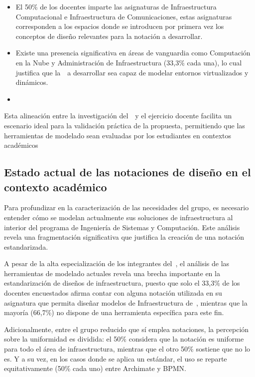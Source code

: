 

\begin{itemize}
	\item El 50\% de los docentes imparte las asignaturas de Infraestructura Computacional e Infraestructura de Comunicaciones, estas asignaturas corresponden a los espacios donde se introducen por primera vez los conceptos de diseño relevantes para la notación a desarrollar.
	\item Existe una presencia significativa en áreas de vanguardia como Computación en la Nube y Administración de Infraestructura (33,3\% cada una), lo cual justifica que la~\NDITI~a desarrollar sea capaz de modelar entornos virtualizados y dinámicos.
	\item 
\end{itemize}

Esta alineación entre la investigación del~\GRID~y el ejercicio docente facilita un escenario ideal para la validación práctica de la propuesta, permitiendo que las herramientas de modelado sean evaluadas por los estudiantes en contextos académicos

\subsection{Estado actual de las notaciones de diseño en el contexto académico}
Para profundizar en la caracterización de las necesidades del grupo, es necesario entender cómo se modelan actualmente sus soluciones de infraestructura al interior del programa de Ingeniería de Sistemas y Computación. Este análisis revela una fragmentación significativa que justifica la creación de una notación estandarizada.


A pesar de la alta especialización de los integrantes del~\GRID{}, el análisis de las herramientas de modelado actuales revela una brecha importante en la estandarización de diseños de infraestructura, puesto que solo el 33,3\% de los docentes encuestados afirma contar con alguna notación utilizada en su asignatura que permita diseñar modelos de Infraestructura de~\TI{}, mientras que la mayoría (66,7\%) no dispone de una herramienta específica para este fin.



Adicionalmente, entre el grupo reducido que sí emplea notaciones, la percepción sobre la uniformidad es dividida: el 50\% considera que la notación es uniforme para todo el área de infraestructura, mientras que el otro 50\% sostiene que no lo es. Y a su vez, en los casos donde se aplica un estándar, el uso se reparte equitativamente (50\% cada uno) entre Archimate y BPMN.

